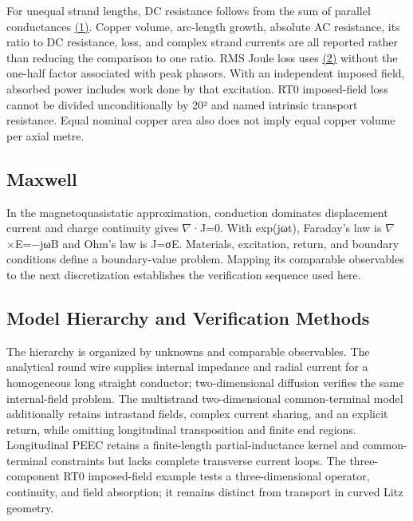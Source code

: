 \documentclass[journal,10pt]{IEEEtran}
\begin{document}
For unequal strand lengths, DC resistance follows from the sum of parallel conductances \href{report_en_ieee.pdf#E01}{(1)}. Copper volume, arc-length growth, absolute AC resistance, its ratio to DC resistance, loss, and complex strand currents are all reported rather than reducing the comparison to one ratio. RMS Joule loss uses \href{report_en_ieee.pdf#E02}{(2)} without the one-half factor associated with peak phasors. With an independent imposed field, absorbed power includes work done by that excitation. RT0 imposed-field loss cannot be divided unconditionally by 20² and named intrinsic transport resistance. Equal nominal copper area also does not imply equal copper volume per axial metre.


\subsection*{Maxwell}
\hypertarget{02.maxwell.heading}{}
In the magnetoquasistatic approximation, conduction dominates displacement current and charge continuity gives \(\nabla\)·J=0. With exp(jωt), Faraday’s law is \(\nabla\)×E=−jωB and Ohm’s law is J=σE. Materials, excitation, return, and boundary conditions define a boundary-value problem. Mapping its comparable observables to the next discretization establishes the verification sequence used here.


\subsection*{Model Hierarchy and Verification Methods}
\hypertarget{02.hierarchy.heading}{}
The hierarchy is organized by unknowns and comparable observables. The analytical round wire supplies internal impedance and radial current for a homogeneous long straight conductor; two-dimensional diffusion verifies the same internal-field problem. The multistrand two-dimensional common-terminal model additionally retains intrastand fields, complex current sharing, and an explicit return, while omitting longitudinal transposition and finite end regions. Longitudinal PEEC retains a finite-length partial-inductance kernel and common-terminal constraints but lacks complete transverse current loops. The three-component RT0 imposed-field example tests a three-dimensional operator, continuity, and field absorption; it remains distinct from transport in curved Litz geometry.
\end{document}
